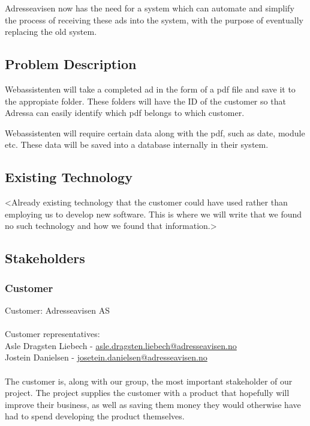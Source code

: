 Adresseavisen now has the need for a system which can automate and simplify the process of receiving these ads into the system, with the purpose of eventually replacing the old system.

\subsection{Problem Description}
Webassistenten will take a completed ad in the form of a pdf file and save it to the appropiate folder. These folders will have the ID of the customer so that Adressa can easily identify which pdf belongs to which customer.

Webassistenten will require certain data along with the pdf, such as date, module etc. These data will be saved into a database internally in their system. %

\subsection{Existing Technology}
<Already existing technology that the customer could have used rather than employing us to develop new software. This is where we will write that we found no such technology and how we found that information.> %

\subsection{Stakeholders}
\subsubsection{Customer}
Customer: Adresseavisen AS\\
\\
Customer representatives:\\
Asle Dragsten Liebech - \href{mailto://asle.dragsten.liebech@adresseavisen.no}{asle.dragsten.liebech@adresseavisen.no}\\
Jostein Danielsen - \href{mailto://josetein.danielsen@adresseavisen.no}{josetein.danielsen@adresseavisen.no}\\ %
\\
The customer is, along with our group, the most important stakeholder of our project. The project supplies the customer with a product that hopefully will improve their business, as well as saving them money they would otherwise have had to spend developing the product themselves.

